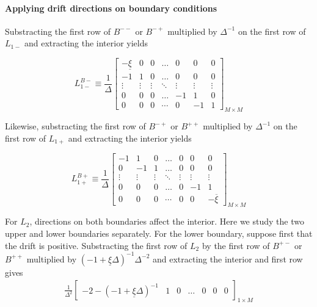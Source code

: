 \documentclass[11pt]{article}
\theoremstyle{definition}
\begin{document}
\paragraph{Applying drift directions on boundary conditions}
Substracting the first row of $B^{--}$ or $B^{-+}$ multiplied by $\Delta^{-1}$ on the first row of $L_{1-}$ and extracting the interior yields

\begin{equation}
L_{1-}^{B-} \equiv \frac{1}{\Delta}\begin{bmatrix}
-\underline{\xi} &0&0&\dots&0&0&0\\
-1&1&0&\dots&0&0&0\\
\vdots&\vdots&\vdots&\ddots&\vdots&\vdots&\vdots\\
0&0&0&\dots&-1&1&0\\
0&0&0&\cdots&0&-1&1
\end{bmatrix}_{M\times M} \label{eq:L-1-regular-left}
\end{equation}

Likewise, substracting the first row of $B^{-+}$ or $B^{++}$ multiplied by $\Delta^{-1}$ on the first row of $L_{1+}$ and extracting the interior yields

\begin{equation}
L_{1+}^{B+} \equiv \frac{1}{\Delta}\begin{bmatrix}
-1 &1&0&\dots&0&0&0\\
0&-1&1&\dots&0&0&0\\
\vdots&\vdots&\vdots&\ddots&\vdots&\vdots&\vdots\\
0&0&0&\dots&0&-1&1\\
0&0&0&\cdots&0&0&-\overline{\xi} 
\end{bmatrix}_{M\times M} \label{eq:L-1p-regular-right}
\end{equation}

For $L_2$, directions on both boundaries affect the interior. Here we study the two upper and lower boundaries separately. For the lower boundary, suppose first that the drift is positive. Substracting the first row of $L_2$ by the first row of $B^{+-}$ or $B^{++}$ multiplied by $(-1 + \underline{\xi} \Delta )^{-1} \Delta^{-2}$ and extracting the interior and first row gives
\begin{align}
\frac{1}{\Delta^2}\begin{bmatrix}
-2 - (-1 + \underline{\xi}\Delta)^{-1} &1&0&\dots&0&0&0
\end{bmatrix}_{1\times M}
\end{align}
\end{document}
